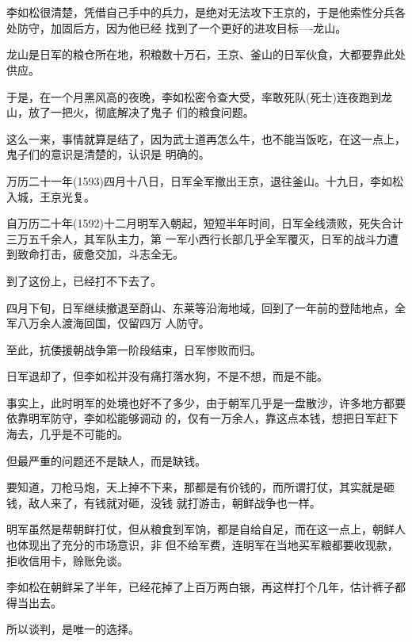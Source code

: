 \documentclass[11pt,a4paper,onecolumn]{article}
\begin{document}
\section[\thesection]{}

李如松很清楚，凭借自己手中的兵力，是绝对无法攻下王京的，于是他索性分兵各处防守，加固后方，因为他已经
找到了一个更好的进攻目标----龙山。

龙山是日军的粮仓所在地，积粮数十万石，王京、釜山的日军伙食，大都要靠此处供应。

于是，在一个月黑风高的夜晚，李如松密令查大受，率敢死队(死士)连夜跑到龙山，放了一把火，彻底解决了鬼子
们的粮食问题。

这么一来，事情就算是结了，因为武士道再怎么牛，也不能当饭吃，在这一点上，鬼子们的意识是清楚的，认识是
明确的。

万历二十一年(1593)四月十八日，日军全军撤出王京，退往釜山。十九日，李如松入城，王京光复。

自万历二十年(1592)十二月明军入朝起，短短半年时间，日军全线溃败，死失合计三万五千余人，其军队主力，第
一军小西行长部几乎全军覆灭，日军的战斗力遭到致命打击，疲惫交加，斗志全无。

到了这份上，已经打不下去了。

四月下旬，日军继续撤退至蔚山、东莱等沿海地域，回到了一年前的登陆地点，全军八万余人渡海回国，仅留四万
人防守。

至此，抗倭援朝战争第一阶段结束，日军惨败而归。

日军退却了，但李如松并没有痛打落水狗，不是不想，而是不能。

事实上，此时明军的处境也好不了多少，由于朝军几乎是一盘散沙，许多地方都要依靠明军防守，李如松能够调动
的，仅有一万余人，靠这点本钱，想把日军赶下海去，几乎是不可能的。

但最严重的问题还不是缺人，而是缺钱。

要知道，刀枪马炮，天上掉不下来，那都是有价钱的，而所谓打仗，其实就是砸钱，敌人来了，有钱就对砸，没钱
就打游击，朝鲜战争也一样。

明军虽然是帮朝鲜打仗，但从粮食到军饷，都是自给自足，而在这一点上，朝鲜人也体现出了充分的市场意识，非
但不给军费，连明军在当地买军粮都要收现款，拒收信用卡，赊账免谈。

李如松在朝鲜呆了半年，已经花掉了上百万两白银，再这样打个几年，估计裤子都得当出去。

所以谈判，是唯一的选择。

\section[\thesection]{}
\end{document}

